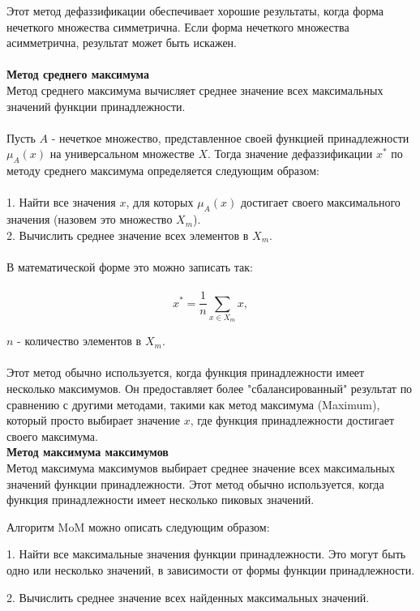 \documentclass{article}
\begin{document}
    Этот метод дефаззификации обеспечивает хорошие результаты, когда форма нечеткого множества симметрична. Если форма нечеткого множества асимметрична, результат может быть искажен.\\
    ~\\
    \textbf{Метод среднего максимума}\\
    Метод среднего максимума вычисляет среднее значение всех максимальных значений функции принадлежности.\\
    ~\\
    Пусть $A$ - нечеткое множество, представленное своей функцией принадлежности $\mu_A(x)$ на универсальном множестве $X$. Тогда значение дефаззификации $x^*$ по методу среднего максимума определяется следующим образом:\\
    ~\\
    1. Найти все значения $x$, для которых $\mu_A(x)$ достигает своего максимального значения (назовем это множество $X_m$).\\
    2. Вычислить среднее значение всех элементов в $X_m$.\\
    ~\\
    В математической форме это можно записать так:\\
    ~\\
    $$x^* = \frac{1}{n} \sum_{x \in X_m} x,$$

    $n$ - количество элементов в $X_m$.\\
    ~\\
    Этот метод обычно используется, когда функция принадлежности имеет несколько максимумов. Он предоставляет более "{}сбалансированный"{} результат по сравнению с другими методами, такими как метод максимума (Maximum), который просто выбирает значение $x$, где функция принадлежности достигает своего максимума.
    ~\\
    \textbf{Метод максимума максимумов}\\
    Метод максимума максимумов выбирает среднее значение всех максимальных значений функции принадлежности. Этот метод обычно используется, когда функция принадлежности имеет несколько пиковых значений.

    Алгоритм MoM можно описать следующим образом:

    1. Найти все максимальные значения функции принадлежности. Это могут быть одно или несколько значений, в зависимости от формы функции принадлежности.

    2. Вычислить среднее значение всех найденных максимальных значений.
\end{document}
